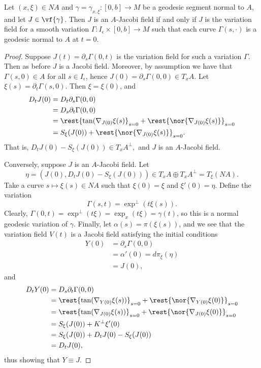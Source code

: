 \begin{thm}
    Let $(x,\xi)\in NA$ and $\gamma=\gamma_{x,\xi}:[0,b]\to M$ be a geodesic segment normal to $A$, and let $J\in\vf{\gamma}$.  Then $J$ is an $A$-Jacobi field if and only if $J$ is the variation field for a smooth variation $\Gamma:I_\epsilon\times[0,b]\to M$ such that each curve $\Gamma(s,\cdot)$ is a geodesic normal to $A$ at $t=0$.  
\end{thm}

\begin{proof}
Suppose $J(t)=\partial_s\Gamma(0,t)$ is the variation field for such a variation $\Gamma$.  Then as before $J$ is a Jacobi field.  Moreover, by assumption we have that $\Gamma(s,0)\in A$ for all $s\in I_\epsilon$, hence $J(0)=\partial_s\Gamma(0,0)\in T_xA$.  Let $\xi(s)=\partial_t\Gamma(s,0)$.  Then $\xi=\xi(0)$, and
\begin{align*}
	D_tJ(0)&=D_t\partial_s\Gamma(0,0)\\
	&=D_s\partial_t\Gamma(0,0)\\
	&=\rest{\tan(\nabla_{J(0)}\xi(s)}_{s=0}+\rest{\nor{\nabla_{J(0)}\xi(s)}}_{s=0}\\
	&=S_{\xi}(J(0))+\rest{\nor{\nabla_{J(0)}\xi(s)}}_{s=0}.
\end{align*}
That is, $D_tJ(0)-S_\xi(J(0))\in T_xA^\perp,$ and $J$ is an $A$-Jacobi field.

Conversely, suppose $J$ is an $A$-Jacobi field.  Let 
$$\eta=(J(0),D_tJ(0)-S_\xi(J(0)))\in T_xA\oplus T_xA^\perp=T_\xi(NA).$$
Take a curve $s\mapsto\xi(s)\in NA$ such that $\xi(0)=\xi$ and $\xi'(0)=\eta$.  Define the variation
$$\Gamma(s,t)=\exp^\perp(t\xi(s)).$$
Clearly, $\Gamma(0,t)=\exp^\perp(t\xi)=\exp_x(t\xi)=\gamma(t)$, so this is a normal geodesic variation of $\gamma$.  Finally, let $\alpha(s)=\pi(\xi(s))$, and we see that the variation field $V(t)$ is a Jacobi field satisfying the initial conditions
\begin{align*}
	Y(0)&=\partial_s\Gamma(0,0)\\
	&=\alpha'(0)=d\pi_\xi(\eta)\\
	&=J(0),
\end{align*}
and
\begin{align*}
	D_tY(0)&=D_s\partial_t\Gamma(0,0)\\
	&=\rest{\tan(\nabla_{Y(0)}\xi(s))}_{s=0}+\rest{\nor{\nabla_{Y(0)}\xi(0)}}_{s=0}\\
	&=\rest{\tan(\nabla_{J(0)}\xi(s))}_{s=0}+\rest{\nor{\nabla_{J(0)}\xi(0)}}_{s=0}\\
	&=S_\xi(J(0))+K^\perp\xi'(0)\\
	&=S_\xi(J(0))+D_tJ(0)-S_\xi(J(0))\\
	&=D_tJ(0),
\end{align*}
thus showing that $Y\equiv J$.
\end{proof}

